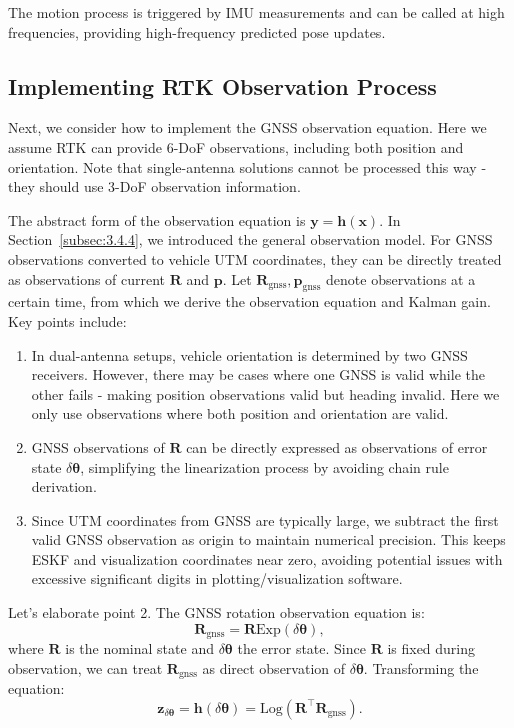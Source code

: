 The motion process is triggered by IMU measurements and can be called at high frequencies, providing high-frequency predicted pose updates.

\subsection{Implementing RTK Observation Process}
Next, we consider how to implement the GNSS observation equation. Here we assume RTK can provide 6-DoF observations, including both position and orientation. Note that single-antenna solutions cannot be processed this way - they should use 3-DoF observation information.

The abstract form of the observation equation is $\mathbf{y} = \mathbf{h}(\mathbf{x})$. In Section~\ref{subsec:3.4.4}, we introduced the general observation model. For GNSS observations converted to vehicle UTM coordinates, they can be directly treated as observations of current $\mathbf{R}$ and $\mathbf{p}$. Let $\mathbf{R}_{\mathrm{gnss}}, \mathbf{p}_{\mathrm{gnss}}$ denote observations at a certain time, from which we derive the observation equation and Kalman gain. Key points include:

\begin{enumerate}
	\item In dual-antenna setups, vehicle orientation is determined by two GNSS receivers. However, there may be cases where one GNSS is valid while the other fails - making position observations valid but heading invalid. Here we only use observations where both position and orientation are valid.
	
	\item GNSS observations of $\mathbf{R}$ can be directly expressed as observations of error state $\delta \boldsymbol{\theta}$, simplifying the linearization process by avoiding chain rule derivation.
	
	\item Since UTM coordinates from GNSS are typically large, we subtract the first valid GNSS observation as origin to maintain numerical precision. This keeps ESKF and visualization coordinates near zero, avoiding potential issues with excessive significant digits in plotting/visualization software.
\end{enumerate}

Let's elaborate point 2. The GNSS rotation observation equation is:
\begin{equation}\label{eq:obs-gnss}
	\mathbf{R}_{\mathrm{gnss}} = \mathbf{R} \mathrm{Exp}(\delta \boldsymbol{\theta}),
\end{equation}
where $\mathbf{R}$ is the nominal state and $\delta \boldsymbol{\theta}$ the error state. Since $\mathbf{R}$ is fixed during observation, we can treat $\mathbf{R}_{\mathrm{gnss}}$ as direct observation of $\delta \boldsymbol{\theta}$. Transforming the equation:
\begin{equation}
\mathbf{z}_{\delta \boldsymbol{\theta}} = \mathbf{h}(\delta \boldsymbol{\theta}) = \mathrm{Log} 
\left(\mathbf{R}^\top \mathbf{R}_{\mathrm{gnss}} \right).
\end{equation}
	
